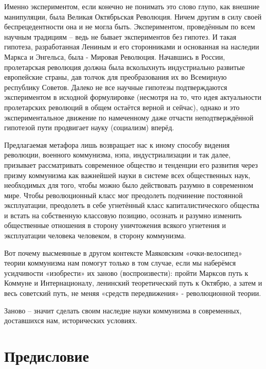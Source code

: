 \documentclass[12pt,a4paper,openany]{book}
\begin{document}
Именно экспериментом, если конечно не понимать это слово глупо, как внешние манипуляции, была Великая Октябрьская Революция. Ничем другим в силу своей беспрецедентности она и не могла быть. Экспериментом, проведённым по всем научным традициям – ведь не бывает экспериментов без гипотез. И такая гипотеза, разработанная Лениным и его сторонниками и основанная на наследии Маркса и Энгельса, была - Мировая Революция. Начавшись в России, пролетарская революция должна была всколыхнуть индустриально развитые европейские страны, дав толчок для преобразования их во Всемирную республику Советов. Далеко не все научные гипотезы подтверждаются экспериментом в исходной формулировке (несмотря на то, что идея актуальности пролетарских революций в общем остаётся верной и сейчас), однако и это экспериментальное движение по намеченному даже отчасти неподтверждённой гипотезой пути продвигает науку (социализм) вперёд.

Предлагаемая метафора лишь возвращает нас к иному способу видения революции, военного коммунизма, нэпа, индустриализации и так далее, призывает рассматривать современное общество и тенденции его развития через призму коммунизма как важнейшей науки в системе всех общественных наук, необходимых для того, чтобы можно было действовать разумно в современном мире. Чтобы революционный класс мог преодолеть подчинение постоянной эксплуатации, преодолеть в себе угнетённый класс капиталистического общества и встать на собственную классовую позицию, осознать и разумно изменить общественные отношения в сторону уничтожения всякого угнетения и эксплуатации человека человеком, в сторону коммунизма.

Вот почему высмеянные в другом контексте Маяковским «очки-велосипед» теории коммунизма нам помогут только в том случае, если мы наберёмся усидчивости «изобрести» их заново (воспроизвести): пройти Марксов путь к Коммуне и Интернационалу, ленинский теоретический путь к Октябрю, а затем и весь советский путь, не меняя «средств передвижения» - революционной теории.

Заново – значит сделать своим наследие науки коммунизма в современных, доставшихся нам, исторических условиях.
\ifSubfilesClassLoaded{\setcounter{page}{7}}{}
\section{Предисловие}
\label{sec:02_predislovie}
\end{document}
